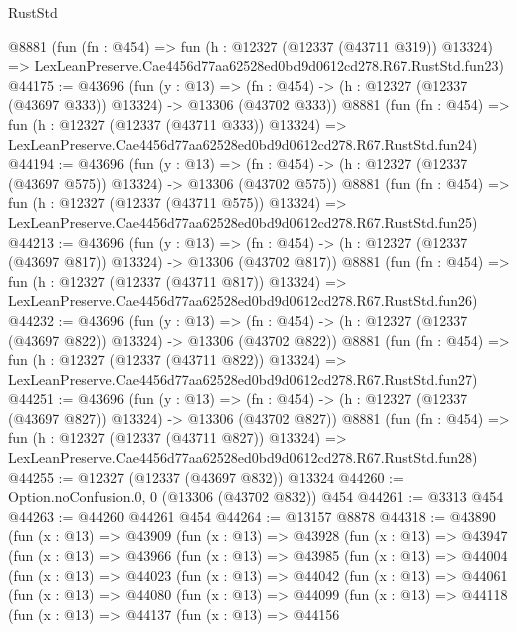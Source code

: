 \begin{lexlean}{RustStd}
\begin{coremodule}
    @8881
    (fun (fn : @454) =>
    fun (h : @12327 (@12337 (@43711 @319)) @13324) =>
    LexLeanPreserve.Cae4456d77aa62528ed0bd9d0612cd278.R67.RustStd.fun23)
@44175 := @43696
    (fun (y : @13) =>
    (fn : @454) -> (h : @12327 (@12337 (@43697 @333)) @13324) -> @13306 (@43702 @333))
    @8881
    (fun (fn : @454) =>
    fun (h : @12327 (@12337 (@43711 @333)) @13324) =>
    LexLeanPreserve.Cae4456d77aa62528ed0bd9d0612cd278.R67.RustStd.fun24)
@44194 := @43696
    (fun (y : @13) =>
    (fn : @454) -> (h : @12327 (@12337 (@43697 @575)) @13324) -> @13306 (@43702 @575))
    @8881
    (fun (fn : @454) =>
    fun (h : @12327 (@12337 (@43711 @575)) @13324) =>
    LexLeanPreserve.Cae4456d77aa62528ed0bd9d0612cd278.R67.RustStd.fun25)
@44213 := @43696
    (fun (y : @13) =>
    (fn : @454) -> (h : @12327 (@12337 (@43697 @817)) @13324) -> @13306 (@43702 @817))
    @8881
    (fun (fn : @454) =>
    fun (h : @12327 (@12337 (@43711 @817)) @13324) =>
    LexLeanPreserve.Cae4456d77aa62528ed0bd9d0612cd278.R67.RustStd.fun26)
@44232 := @43696
    (fun (y : @13) =>
    (fn : @454) -> (h : @12327 (@12337 (@43697 @822)) @13324) -> @13306 (@43702 @822))
    @8881
    (fun (fn : @454) =>
    fun (h : @12327 (@12337 (@43711 @822)) @13324) =>
    LexLeanPreserve.Cae4456d77aa62528ed0bd9d0612cd278.R67.RustStd.fun27)
@44251 := @43696
    (fun (y : @13) =>
    (fn : @454) -> (h : @12327 (@12337 (@43697 @827)) @13324) -> @13306 (@43702 @827))
    @8881
    (fun (fn : @454) =>
    fun (h : @12327 (@12337 (@43711 @827)) @13324) =>
    LexLeanPreserve.Cae4456d77aa62528ed0bd9d0612cd278.R67.RustStd.fun28)
@44255 := @12327 (@12337 (@43697 @832)) @13324
@44260 := Option.noConfusion.{0, 0} (@13306 (@43702 @832)) @454
@44261 := @3313 @454
@44263 := @44260 @44261 @454
@44264 := @13157 @8878
@44318 := @43890
    (fun (x : @13) =>
    @43909
      (fun (x : @13) =>
      @43928
        (fun (x : @13) =>
        @43947
          (fun (x : @13) =>
          @43966
            (fun (x : @13) =>
            @43985
              (fun (x : @13) =>
              @44004
                (fun (x : @13) =>
                @44023
                  (fun (x : @13) =>
                  @44042
                    (fun (x : @13) =>
                    @44061
                      (fun (x : @13) =>
                      @44080
                        (fun (x : @13) =>
                        @44099
                          (fun (x : @13) =>
                          @44118
                            (fun (x : @13) =>
                            @44137
                              (fun (x : @13) =>
                              @44156

\end{coremodule}
\end{lexlean}
